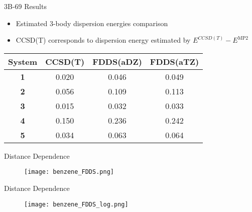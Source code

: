 \documentclass{beamer}
\begin{document}
        \begin{frame}{3B-69 Results}
            \begin{itemize}
                \item Estimated 3-body dispersion energies comparison
                \item CCSD(T) corresponds to dispersion energy estimated by $E^{CCSD(T)} - E^{\text{MP2}}$
            \end{itemize}
            \begin{table}
                \centering
                \begin{tabular}{c c c c}
                    \hline
                    System & CCSD(T) & FDDS(aDZ) & FDDS(aTZ) \\ \hline
                    \textbf{1} & 0.020 & 0.046 & 0.049 \\ 
                    \textbf{2} & 0.056 & 0.109 & 0.113 \\
                    \textbf{3} & 0.015 & 0.032 & 0.033 \\
                    \textbf{4} & 0.150 & 0.236 & 0.242 \\
                    \textbf{5} & 0.034 & 0.063 & 0.064 \\ \hline
                \end{tabular}
            \end{table}
        \end{frame}

        \begin{frame}{Distance Dependence}
            \begin{figure}
                \centering
                \texttt{[image: benzene\_FDDS.png]}
            \end{figure}
        \end{frame}

        \begin{frame}{Distance Dependence}
            \begin{figure}
                \centering
                \texttt{[image: benzene\_FDDS\_log.png]}
            \end{figure}
        \end{frame}
\end{document}
